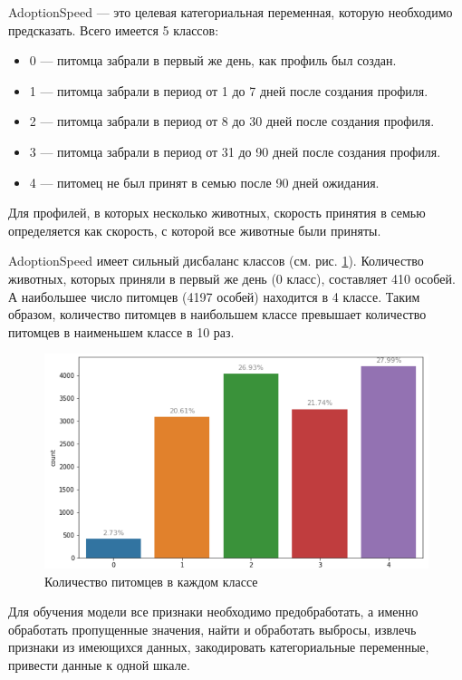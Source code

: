 \documentclass[14pt]{mmcs_article}
\begin{document}
AdoptionSpeed --- это целевая категориальная переменная, которую необходимо предсказать. Всего имеется 5 классов:

\begin{itemize}
	\item 0 --- питомца забрали в первый же день, как профиль был создан.
	\item 1 --- питомца забрали в период от 1 до 7 дней после создания профиля.
	\item 2 --- питомца забрали в период от 8 до 30 дней после создания профиля.
	\item 3 --- питомца забрали в период от 31 до 90 дней после создания профиля.
	\item 4 --- питомец не был принят в семью после 90 дней ожидания.
\end{itemize}

Для профилей, в которых несколько животных, скорость принятия в семью определяется как скорость, с которой все животные были приняты. 

AdoptionSpeed имеет сильный дисбаланс классов (см. рис. \ref{analyse:speed}). Количество животных, которых приняли в первый же день (0 класс), составляет 410 особей. А наибольшее число питомцев (4197 особей) находится в 4 классе. Таким образом, количество питомцев в наибольшем классе превышает количество питомцев в наименьшем классе в 10 раз.

\begin{figure}[H]
	\centering
	\includegraphics[scale=0.8]{speed.png}
	\caption{Количество питомцев в каждом классе}\label{analyse:speed}
\end{figure}

Для обучения модели все признаки необходимо предобработать, а именно обработать пропущенные значения, найти и обработать выбросы, извлечь признаки из имеющихся данных, закодировать категориальные переменные, привести данные к одной шкале.
\end{document}
